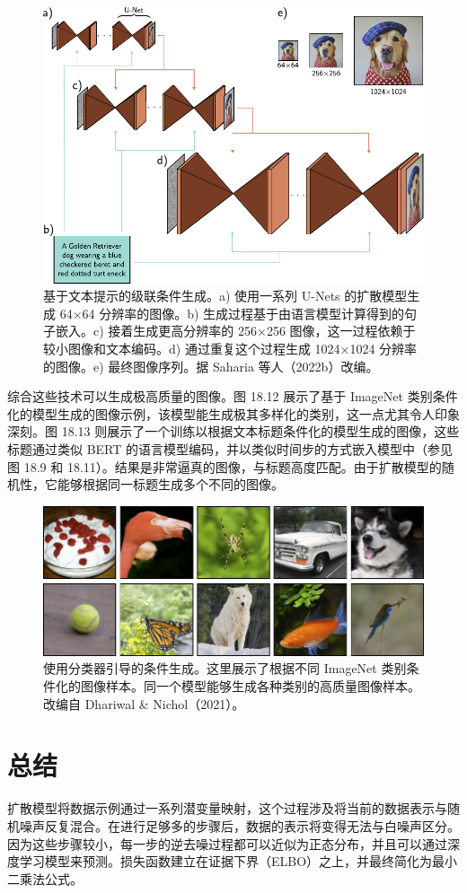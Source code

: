\documentclass[lang=cn,newtx,10pt,scheme=chinese]{elegantbook}
\begin{document}
\begin{figure}[ht!]
\centering
\includegraphics[width=0.7\linewidth]{PDFFigures/UDLChap18PDF/DiffusionCascade.pdf}
\caption{基于文本提示的级联条件生成。a) 使用一系列 U-Nets 的扩散模型生成 64×64 分辨率的图像。b) 生成过程基于由语言模型计算得到的句子嵌入。c) 接着生成更高分辨率的 256×256 图像，这一过程依赖于较小图像和文本编码。d) 通过重复这个过程生成 1024×1024 分辨率的图像。e) 最终图像序列。据 Saharia 等人（2022b）改编。}
\end{figure}


综合这些技术可以生成极高质量的图像。图 18.12 展示了基于 ImageNet 类别条件化的模型生成的图像示例，该模型能生成极其多样化的类别，这一点尤其令人印象深刻。图 18.13 则展示了一个训练以根据文本标题条件化的模型生成的图像，这些标题通过类似 BERT 的语言模型编码，并以类似时间步的方式嵌入模型中（参见图 18.9 和 18.11）。结果是非常逼真的图像，与标题高度匹配。由于扩散模型的随机性，它能够根据同一标题生成多个不同的图像。

\begin{figure}[ht!]
\centering
\includegraphics[width=0.7\linewidth]{PDFFigures/UDLChap18PDF/DiffusionConditional.pdf}
\caption{使用分类器引导的条件生成。这里展示了根据不同 ImageNet 类别条件化的图像样本。同一个模型能够生成各种类别的高质量图像样本。改编自 Dhariwal \& Nichol（2021）。}
\end{figure}


\section{总结}
扩散模型将数据示例通过一系列潜变量映射，这个过程涉及将当前的数据表示与随机噪声反复混合。在进行足够多的步骤后，数据的表示将变得无法与白噪声区分。因为这些步骤较小，每一步的逆去噪过程都可以近似为正态分布，并且可以通过深度学习模型来预测。损失函数建立在证据下界（ELBO）之上，并最终简化为最小二乘法公式。
\end{document}
